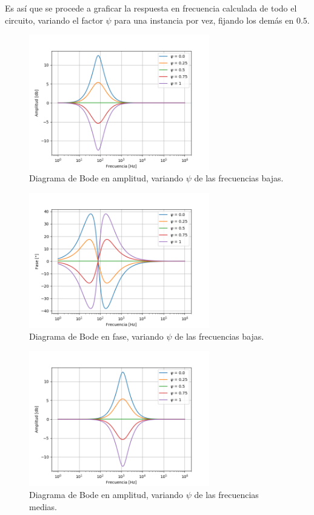 Es así que se procede a graficar la respuesta en frecuencia calculada de todo el circuito, variando el factor $\psi$ para una instancia por vez, fijando los demás en $0.5$.
\begin{figure}[H]
\centering
	\includegraphics[width=0.7\textwidth]{Imagenes/Low-psi-bode.png}
	\caption{Diagrama de Bode en amplitud, variando $\psi$ de las frecuencias bajas.}
	\label{fig:bode_modulo_low}
\end{figure}
\begin{figure}[H]
\centering
	\includegraphics[width=0.7\textwidth]{Imagenes/Low-psi-ph.png}
	\caption{Diagrama de Bode en fase, variando $\psi$ de las frecuencias bajas.}
	\label{fig:bode_ph_low}
\end{figure}
\begin{figure}[H]
\centering
	\includegraphics[width=0.7\textwidth]{Imagenes/Medium-psi-bode.png}
	\caption{Diagrama de Bode en amplitud, variando $\psi$ de las frecuencias medias.}
	\label{fig:bode_modulo_med}
\end{figure}
